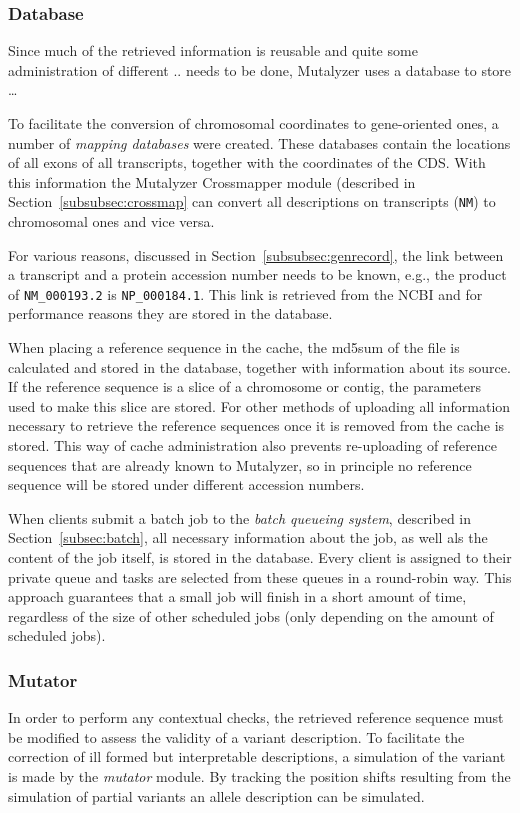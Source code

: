 \documentclass{article}
\begin{document}
\subsubsection{Database} \label{subsubsec:db}
Since much of the retrieved information is reusable and quite some
administration of different .. needs to be done, Mutalyzer uses a database to
store \ldots

To facilitate the conversion of chromosomal coordinates to gene-oriented ones,
a number of \emph{mapping databases} were created. These databases contain the
locations of all exons of all transcripts, together with the coordinates of the
CDS. With this information the Mutalyzer Crossmapper module (described in
Section~\ref{subsubsec:crossmap} can convert all descriptions on transcripts
(\texttt{NM}) to chromosomal ones and vice versa.

For various reasons, discussed in Section~\ref{subsubsec:genrecord}, the link
between a transcript and a protein accession number needs to be known, e.g.,
the product of \texttt{NM\_000193.2} is \texttt{NP\_000184.1}. This link is
retrieved from the NCBI and for performance reasons they are stored in the
database.

When placing a reference sequence in the cache, the md5sum of the file is
calculated and stored in the database, together with information about its
source. If the reference sequence is a slice of a chromosome or contig, the
parameters used to make this slice are stored. For other methods of uploading
all information necessary to retrieve the reference sequences once it is
removed from the cache is stored. This way of cache administration also
prevents re-uploading of reference sequences that are already known to
Mutalyzer, so in principle no reference sequence will be stored under different
accession numbers.

When clients submit a batch job to the \emph{batch queueing system}, described
in Section~\ref{subsec:batch}, all necessary information about the job, as well
als the content of the job itself, is stored in the database. Every client is
assigned to their private queue and tasks are selected from these queues in a
round-robin way. This approach guarantees that a small job will finish in a
short amount of time, regardless of the size of other scheduled jobs (only
depending on the amount of scheduled jobs).

\subsubsection{Mutator}
In order to perform any contextual checks, the retrieved reference sequence
must be modified to assess the validity of a variant description. To facilitate
the correction of ill formed but interpretable descriptions, a simulation of
the variant is made by the \emph{mutator} module. By tracking the position
shifts resulting from the simulation of partial variants an allele description
can be simulated.
\end{document}
